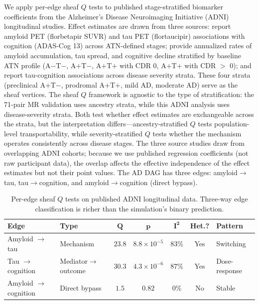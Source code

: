 \documentclass[11pt]{article}
\begin{document}
We apply per-edge sheaf $Q$ tests to published stage-stratified biomarker coefficients from the Alzheimer's Disease Neuroimaging Initiative (ADNI) longitudinal studies.
Effect estimates are drawn from three sources: \citet{hanseeuw2019association} report amyloid PET (florbetapir SUVR) and tau PET (flortaucipir) associations with cognition (ADAS-Cog 13) across ATN-defined stages; \citet{jack2019longitudinal} provide annualized rates of amyloid accumulation, tau spread, and cognitive decline stratified by baseline ATN profile (A$-$T$-$, A$+$T$-$, A$+$T$+$ with CDR 0, A$+$T$+$ with CDR $>$ 0); and \citet{ossenkoppele2022tau} report tau-cognition associations across disease severity strata.
These four strata (preclinical A$+$T$-$, prodromal A$+$T$+$, mild AD, moderate AD) serve as the sheaf vertices.
The sheaf $Q$ framework is agnostic to the type of stratification: the 71-pair MR validation uses ancestry strata, while this ADNI analysis uses disease-severity strata.
Both test whether effect estimates are exchangeable across the strata, but the interpretation differs---ancestry-stratified $Q$ tests population-level transportability, while severity-stratified $Q$ tests whether the mechanism operates consistently across disease stages.
The three source studies \citep{hanseeuw2019association, jack2019longitudinal, ossenkoppele2022tau} draw from overlapping ADNI cohorts; because we use published regression coefficients (not raw participant data), the overlap affects the effective independence of the effect estimates but not their point values.
The AD DAG has three edges: amyloid$\to$tau, tau$\to$cognition, and amyloid$\to$cognition (direct bypass).

\begin{table}[t]
\centering
\caption{Per-edge sheaf $Q$ tests on published ADNI longitudinal data. Three-way edge classification is richer than the simulation's binary prediction.}
\label{tab:realdata-dag}
\small
\begin{tabular}{@{}llccccl@{}}
\toprule
\textbf{Edge} & \textbf{Type} & $\boldsymbol{Q}$ & $\boldsymbol{p}$ & $\boldsymbol{I^2}$ & \textbf{Het.?} & \textbf{Pattern} \\
\midrule
Amyloid $\to$ tau & Mechanism & $23.8$ & $8.8 \times 10^{-5}$ & $83\%$ & Yes & Switching \\
Tau $\to$ cognition & Mediator$\to$outcome & $30.3$ & $4.3 \times 10^{-6}$ & $87\%$ & Yes & Dose-response \\
Amyloid $\to$ cognition & Direct bypass & $1.5$ & $0.82$ & $0\%$ & No & Stable \\
\bottomrule
\end{tabular}
\end{table}
\end{document}
